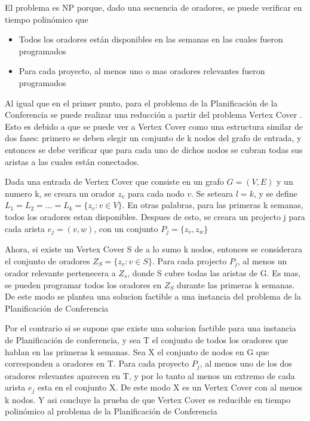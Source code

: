 El problema es NP porque, dado una secuencia de oradores, se puede verificar en tiempo polinómico que 
  \begin{itemize}
    \item Todos los oradores están disponibles en las semanas en las cuales fueron programados
    \item Para cada proyecto, al menos uno o mas oradores relevantes fueron programados
  \end{itemize}

Al igual que en el primer punto, para el problema de la Planificación de la Conferencia se puede realizar una reducción a partir del problema Vertex Cover \cite{vertexCover}. Esto es debido a que se puede ver a Vertex Cover como una estructura similar de dos fases: primero se deben elegir un conjunto de k nodos del grafo de entrada, y entonces se debe verificar que para cada uno de dichos nodos se cubran todas sus aristas a las cuales están conectados.

Dada una entrada de Vertex Cover que consiste en un grafo $G = (V, E)$ y un numero k, se creara un orador $z_v$ para cada nodo $v$. Se seteara $l = k$, y se define $L_1 = L_2 = \ldots = L_k = \{z_v: v \in V\}$. En otras palabras, para las primeras k semanas, todos los oradores estan disponibles. Despues de esto, se creara un projecto j para cada arista $e_j=(v, w)$, con un conjunto $P_j = \{z_v,z_w\}$

Ahora, si existe un Vertex Cover S de a lo sumo k nodos, entonces se considerara el conjunto de oradores $Z_S = \{z_v : v \in S\}$. Para cada projecto $P_j$, al menos un orador relevante pertenecera a $Z_s$, donde S cubre todas las aristas de G. Es mas, se pueden programar todos los oradores en $Z_S$ durante las primeras k semanas. De este modo se plantea una solucion factible a una instancia del problema de la Planificación de Conferencia

Por el contrario si se supone que existe una solucion factible para una instancia de Planificación de conferencia, y sea T el conjunto de todos los oradores que hablan en las primeras k semanas.
Sea X el conjunto de nodos en G que corresponden a oradores en T. Para cada proyecto $P_j$, al menos uno de los dos oradores relevantes aparecen en T, y por lo tanto al menos un extremo de cada arista $e_j$ esta en el conjunto X. De este modo X es un Vertex Cover con al menos k nodos. Y asi concluye la prueba de que Vertex Cover es reducible en tiempo polinómico al problema de la  Planificación de Conferencia

